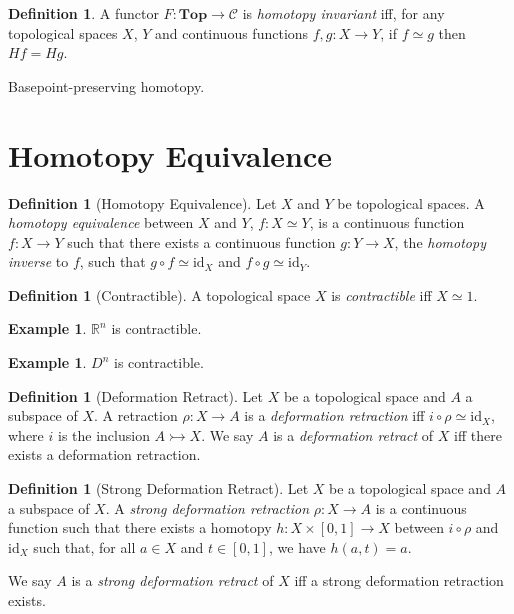 \documentclass{book}
\theoremstyle{definition}
\newtheorem{df}[ax]{Definition}
\newtheorem{ex}[ax]{Example}
\newcommand{\id}[1]{\ensuremath{\mathrm{id}_{#1}}}
\begin{document}
\begin{df}
A functor $F : \mathbf{Top} \rightarrow \mathcal{C}$ is \emph{homotopy invariant} iff, for any topological spaces $X$, $Y$ and continuous functions $f,g : X \rightarrow Y$, if $f \simeq g$ then $Hf = Hg$.
\end{df}

Basepoint-preserving homotopy.

\section{Homotopy Equivalence}

\begin{df}[Homotopy Equivalence]
Let $X$ and $Y$ be topological spaces. A \emph{homotopy equivalence} between $X$ and $Y$, $f : X \simeq Y$, is a continuous function $f : X \rightarrow Y$ such that there exists a continuous function $g : Y \rightarrow X$, the \emph{homotopy inverse} to $f$, such that $g \circ f \simeq \id{X}$ and $f \circ g \simeq \id{Y}$.
\end{df}

\begin{df}[Contractible]
A topological space $X$ is \emph{contractible} iff $X \simeq 1$.
\end{df}

\begin{ex}
$\mathbb{R}^n$ is contractible.
\end{ex}

\begin{ex}
$D^n$ is contractible.
\end{ex}

\begin{df}[Deformation Retract]
Let $X$ be a topological space and $A$ a subspace of $X$. A retraction $\rho : X \rightarrow A$ is a \emph{deformation retraction} iff $i \circ \rho \simeq \id{X}$, where $i$ is the inclusion $A \rightarrowtail X$. We say $A$ is a \emph{deformation retract} of $X$ iff there exists a deformation retraction.
\end{df}

\begin{df}[Strong Deformation Retract]
Let $X$ be a topological space and $A$ a subspace of $X$. A \emph{strong deformation retraction} $\rho : X \rightarrow A$ is a continuous function such that there exists a homotopy $h : X \times [0,1] \rightarrow X$ between $i \circ \rho$ and $\id{X}$ such that, for all $a \in X$ and $t \in [0,1]$, we have $h(a,t) = a$.

We say $A$ is a \emph{strong deformation retract} of $X$ iff a strong deformation retraction exists.
\end{df}
\end{document}
